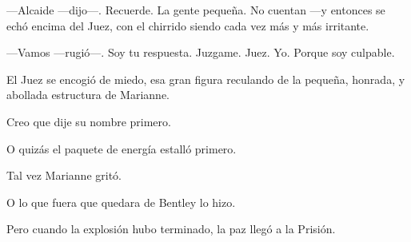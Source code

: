---Alcaide ---dijo---. Recuerde. La gente pequeña. No cuentan ---y
entonces se echó encima del Juez, con el chirrido siendo cada vez más y
más irritante.

---Vamos ---rugió---. Soy tu respuesta. Juzgame. Juez. Yo. Porque soy
culpable.

El Juez se encogió de miedo, esa gran figura reculando de la pequeña,
honrada, y abollada estructura de Marianne.

Creo que dije su nombre primero.

O quizás el paquete de energía estalló primero.

Tal vez Marianne gritó.

O lo que fuera que quedara de Bentley lo hizo.

Pero cuando la explosión hubo terminado, la paz llegó a la Prisión.